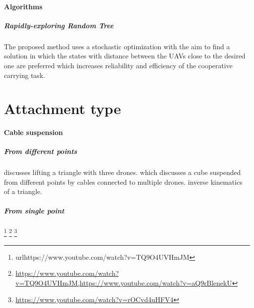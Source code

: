\documentclass{article}
\begin{document}
		\paragraph{Algorithms}
			\subparagraph{Rapidly-exploring Random Tree \cite{lavalle-1998-rapidly-exploring-random-trees-a-new-tool-for-path-planning}}
			 \cite{spurny-2019-cooperative-transport-of-large-objects-by-a-pair-of-unmanned-aerial-systems-using-sampling-based-motion-planning} The proposed method uses a stochastic optimization with the aim to find a solution in which the states with distance between the UAVs close to the desired one are preferred which increases reliability and efficiency of the cooperative carrying task. 
	\section{Attachment type}
		\paragraph{Cable suspension}
		\subparagraph{From different points}
		\cite{michael-2009-cooperative-manipulation-and-transportation-with-aerial-robots} discusses lifting a triangle with three drones. 
		\cite{masone-2016-cooperative-transportation-of-a-payload-using-quadrotors-a-reconfigurable-cable-driven-parallel-robot} which discusses a cube suspended from different points by cables connected to multiple drones.
		\cite{mohiuddin-2020-energy-distribution-in-dual-uav-collaborative-transportation-through-load-sharing}
		\cite{jiang-2013-the-inverse-kinematics-of-cooperative-transport-with-multiple-aerial-robots} inverse kinematics of a triangle.
		\cite{sreenath-2013-dynamics-control-and-planning-for-cooperative-manipulation-of-payloads-suspended-by-cables-from-multiple-quadrotor-robots}
		\subparagraph{From single point}
		\cite{jackson-2020-scalable-cooperative-transport-of-cable-suspended-loads-with-uavs-using-distributed-trajectory-optimization}
		\cite{guerrero-2015-passivity-based-control-for-a-quadrotor-uav-transporting-a-cable-suspended-payload-with-minimum-swing}\footnote{url{https://www.youtube.com/watch?v=TQ9O4UVHmJM}}
		\cite{mohammadi-2020-control-of-multiple-quad-copters-with-a-cable-suspended-payload-subject-to-disturbances}
		\footnote{\url{https://www.youtube.com/watch?v=TQ9O4UVHmJM,https://www.youtube.com/watch?v=aQ9rBlenekU}}
		\cite{mohammadi-2018-decentralized-motion-control-in-a-cabled-based-multi-drone-load-transport-system}
		\cite{marina-2019-flexible-collaborative-transportation-by-a-team-of-rotorcraft}
		\cite{erskine-2019-wrench-analysis-of-cable-suspended-parallel-robots-actuated-by-quadrotor-unmanned-aerial-vehicles} \footnote{\url{https://www.youtube.com/watch?v=rOCvd4uHFV4}}
		\cite{thapa-2019-cooperative-aerial-load-transport-with-attitude-stabilization}
		\cite{xie-2020-towards-cooperative-transport-of-a-suspended-payload-via-two-aerial-robots-with-inertial-sensing} 
		
\end{document}
